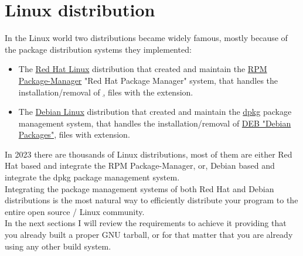 \chapter{Linux distribution}

In the Linux world two distributions became widely famous, mostly because of the package distribution systems they implemented: 
\begin{itemize}
\item The \href{https://www.redhat.com}{Red Hat Linux} distribution that created and maintain the \href{https://en.wikipedia.org/wiki/RPM\_Package\_Manager}{RPM Package-Manager} "Red Hat Package Manager" system, that handles the installation/removal of \href{RPM "Red Hat Packages"}, files with the  extension.
\item The \href{https://www.debian.org}{Debian Linux} distribution that created and maintain the \href{https://en.wikipedia.org/wiki/Dpkg}{dpkg} package management system, that handles the installation/removal of \href{https://en.wikipedia.org/wiki/Deb\_(file\_format)}{DEB "Debian Packages"}, files with  extension.
\end{itemize}
In 2023 there are thousands of Linux distributions, most of them are either Red Hat based and integrate the RPM Package-Manager, or, Debian based and integrate the dpkg package management system. \\
Integrating the package management systems of both Red Hat and Debian distributions is the most natural way to efficiently distribute your program to the entire open source / Linux community. \\
In the next sections I will review the requirements to achieve it providing that you already built a proper GNU tarball, or for that matter that you are already using any other build system. 
\clearpage






